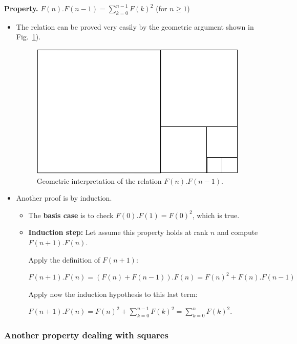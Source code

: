 \noindent \textbf{Property.} 
\label{prop:FiboSumConsecutive}
$F(n).F(n-1)= \sum_{k=0}^{n-1} F(k)^2$ (for $n \geq 1$)

\begin{itemize}

\item The relation  
can be proved very easily by the geometric argument shown in Fig.~\ref{fig:fibosquare}). 

\begin{figure}[h]
\begin{center}
        \includegraphics[scale=0.5]{FiguresMaths//Fiboembedded}
        \caption{Geometric interpretation of the relation $F(n).F(n-1)$.}
        \label{fig:fibosquare}
\end{center}
\end{figure}

\item
Another proof is by induction.

\begin{itemize}
\item
The \textbf{basis case} is to check $F(0).F(1) = F(0)^2$, which is true.

\item
\textbf{Induction step:} Let assume this property holds at rank $n$ and compute $F(n+1).F(n)$.

Apply the definition of $F(n+1)$:

 $F(n+1).F(n) =  (F(n)+F(n-1)).F(n) = F(n)^2 +  F(n).F(n-1)$
 
 Apply now the induction hypothesis to this last term:
 
 $F(n+1).F(n) = F(n)^2 + \sum_{k=0}^{n-1} F(k)^2 = \sum_{k=0}^{n} F(k)^2$.
 \end{itemize}

\end{itemize}

\subsubsection{Another property dealing with squares}

